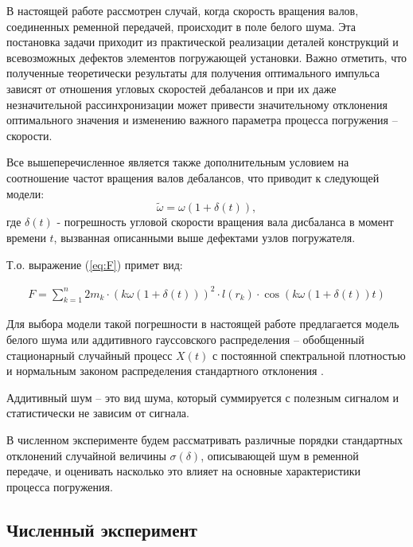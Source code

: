 В настоящей работе рассмотрен случай, когда скорость вращения валов, соединенных ременной передачей, происходит в поле белого шума.
Эта постановка задачи приходит из практической реализации деталей конструкций и всевозможных дефектов элементов погружающей установки.
Важно отметить, что полученные теоретически результаты для получения оптимального импульса зависят от отношения угловых скоростей дебалансов
и при их даже незначительной рассинхронизации может привести значительному отклонения оптимального значения и изменению важного параметра
процесса погружения – скорости.

Все вышеперечисленное является также дополнительным условием на соотношение частот вращения валов дебалансов,
что приводит к следующей модели:
\begin{equation}
    \widetilde{\omega} = \omega (1 + \delta(t)),
\end{equation}
где $\delta(t)$ - погрешность угловой скорости вращения вала дисбаланса в момент времени $t$, вызванная описанными выше дефектами узлов погружателя.

Т.о. выражение (\ref{eq:F}) примет вид:

\begin{equation}
    \label{eq:F_noise}
    \begin{gathered}
        F = \sum\limits_{k = 1}^n 2 m_k \cdot (k \omega (1 + \delta(t)))^2 \cdot l(r_k) \cdot \cos (k \omega (1 + \delta(t)) t)
    \end{gathered}
\end{equation}

Для выбора модели такой погрешности в настоящей работе предлагается модель белого шума или аддитивного
гауссовского распределения -- обобщенный стационарный случайный процесс $X(t)$ с постоянной спектральной
плотностью и нормальным законом распределения стандартного отклонения \cite{yakovleva}.

\begin{definition}
    Аддитивный шум -- это вид шума, который суммируется с полезным сигналом и статистически не зависим
    от сигнала.
\end{definition}

В численном эксперименте будем рассматривать различные порядки стандартных отклонений случайной
величины $\sigma(\delta)$, описывающей шум в ременной передаче, и оценивать насколько это влияет на
основные характеристики процесса погружения.

\subsection{Численный эксперимент}

